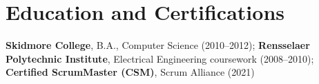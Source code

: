 \documentclass[10pt,letterpaper]{article}
\newcommand{\szmeta}{\fontsize{8pt}{10pt}\selectfont}
\begin{document}
\section*{Education and Certifications}
{\szmeta \textbf{Skidmore College}, B.A., Computer Science {\color{muted}(2010--2012)}; \textbf{Rensselaer Polytechnic Institute}, Electrical Engineering coursework {\color{muted}(2008--2010)}; \textbf{Certified ScrumMaster (CSM)}, Scrum Alliance {\color{muted}(2021)}}\par
\end{document}
